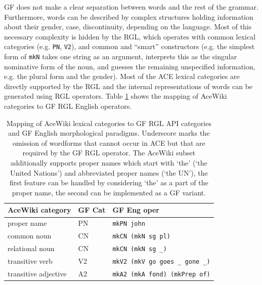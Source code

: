 \documentclass[a4paper]{article}
\def\xp#1{\texttt{#1}}
\begin{document}
GF does not make a clear separation between words and the rest of the grammar.
Furthermore, words can be described by complex structures holding information
about their gender, case, discontinuity, depending on the language. Most of
this necessary complexity is hidden by the RGL, which operates with common
lexical categories (e.g. \texttt{PN}, \texttt{V2}), and common and ``smart''
constructors (e.g. the simplest form of \texttt{mkN} takes one string as an
argument,
interprets this as the singular nominative form of the noun,
and guesses the remaining
unspecified information, e.g. the plural form and the gender).
Most of the ACE lexical categories are directly supported by the RGL and the
internal representations of words can be generated using RGL operators.
Table \ref{mapping_acewiki_to_gf} shows the mapping of AceWiki categories
to GF RGL English operators.

\begin{table}
\begin{center}
\begin{tabular}{ l l l }
\hline
AceWiki category & GF Cat & GF Eng oper \\
\hline
proper name & PN & \xp{mkPN john} \\
common noun & CN & \xp{mkCN (mkN sg pl)} \\
relational noun & CN & \xp{mkCN (mkN sg \_)} \\
transitive verb & V2 & \xp{mkV2 (mkV go goes \_ gone \_)} \\
transitive adjective & A2 & \xp{mkA2 (mkA fond) (mkPrep of)} \\
\hline
\end{tabular}
\end{center}
\caption{Mapping of AceWiki lexical categories
to GF RGL API categories and GF English
morphological paradigms. Underscore marks the omission of wordforms that
cannot occur in ACE but that are required by the GF RGL
operator. The AceWiki subset additionally
supports proper names which start with `the' (`the United Nations')
and abbreviated proper names (`the UN'),
the first feature can be handled by considering `the'
as a part of the proper name, the second can be implemented as a GF
variant.\protect\label{mapping_acewiki_to_gf}}
\end{table}

%
%
\end{document}
